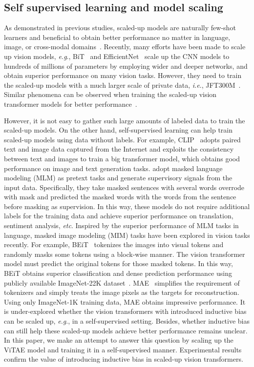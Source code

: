 \documentclass[twocolumn]{svjour3}          \smartqed  \usepackage{natbib}
\newcommand{\ie}{i.e}
\newcommand{\eg}{e.g}
\def\onedot{.\xspace}
\def\eg{\emph{e.g}\onedot}
\def\ie{\emph{i.e}\onedot}
\def\etc{\emph{etc}\onedot}
\begin{document}
\subsection{Self supervised learning and model scaling}

As demonstrated in previous studies, scaled-up models are naturally few-shot learners and beneficial to obtain better performance no matter in language, image, or cross-modal domains~\citep{devlin2018bert,zhai2021scaling,radford2021learning}. 
Recently, many efforts have been made to scale up vision models, \eg, BiT~\citep{kolesnikov2020big} and EfficientNet~\citep{tan2019efficientnet} scale up the CNN models to hundreds of millions of parameters by employing wider and deeper networks, and obtain superior performance on many vision tasks. However, they need to train the scaled-up models with a much larger scale of private data, \ie, JFT300M~\citep{kolesnikov2020big}. Similar phenomena can be observed when training the scaled-up vision transformer models for better performance~\citep{dosovitskiy2020image,zhai2021scaling}. 

However, it is not easy to gather such large amounts of labeled data to train the scaled-up models. On the other hand, self-supervised learning can help train scaled-up models using data without labels. For example, CLIP~\citep{radford2021learning} adopts paired text and image data captured from the Internet and exploits the consistency between text and images to train a big transformer model, which obtains good performance on image and text generation tasks. \citep{liu2019roberta} adopt masked language modeling (MLM) as pretext tasks and generate supervisory signals from the input data. Specifically, they take masked sentences with several words overrode with mask and predicted the masked words with the words from the sentence before masking as supervision. In this way, these models do not require additional labels for the training data and achieve superior performance on translation, sentiment analysis, \etc Inspired by the superior performance of MLM tasks in language, masked image modeling (MIM) tasks have been explored in vision tasks recently. For example, BEiT~\citep{beit} tokenizes the images into visual tokens and randomly masks some tokens using a block-wise manner. The vision transformer model must predict the original tokens for those masked tokens. In this way, BEiT obtains superior classification and dense prediction performance using publicly available ImageNet-22K dataset~\citep{deng2009imagenet}. MAE~\citep{he2021masked} simplifies the requirement of tokenizers and simply treats the image pixels as the targets for reconstruction. Using only ImageNet-1K training data, MAE obtains impressive performance. It is under-explored whether the vision transformers with introduced inductive bias can be scaled up, \eg, in a self-supervised setting. Besides, whether inductive bias can still help these scaled-up models achieve better performance remains unclear. In this paper, we make an attempt to answer this question by scaling up the ViTAE model and training it in a self-supervised manner. Experimental results confirm the value of introducing inductive bias in scaled-up vision transformers.
\end{document}

